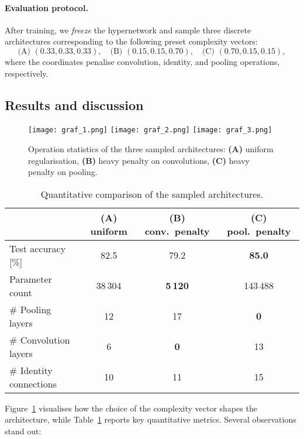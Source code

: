 \documentclass{article}
\begin{document}
\paragraph{Evaluation protocol.}
After training, we \emph{freeze} the hypernetwork and sample three discrete architectures corresponding to the following preset complexity vectors:
\[
\text{(A) } (0.33,0.33,0.33),\quad
\text{(B) } (0.15,0.15,0.70),\quad
\text{(C) } (0.70,0.15,0.15),
\]
where the coordinates penalise convolution, identity, and pooling operations, respectively.  



\subsection{Results and discussion}


\begin{figure}[!ht]
    \centering
    \texttt{[image: graf\_1.png]}\hfill
    \texttt{[image: graf\_2.png]}\hfill
    \texttt{[image: graf\_3.png]}
    \caption{Operation statistics of the three sampled
    architectures: \textbf{(A)} uniform regularisation,
    \textbf{(B)} heavy penalty on convolutions,
    \textbf{(C)} heavy penalty on pooling.}
    \label{fig:operation-distribution}
\end{figure}

\begin{table}[!ht]
    \centering
    \caption{Quantitative comparison of the sampled architectures.}
    \label{tab:quantitative-results}
    \begin{tabular}{lccc}
        \hline
        & (A) uniform & (B) conv.\ penalty & (C) pool.\ penalty \\[2pt] \hline
        Test accuracy [\%]           & 82.5 & 79.2 & \textbf{85.0} \\
        Parameter count              & 38\,304 & \textbf{5\,120} & 143\,488 \\
        \# Pooling layers            & 12 & 17 & \textbf{0} \\
        \# Convolution layers        & 6  & \textbf{0} & 13 \\
        \# Identity connections      & 10 & 11 & 15 \\\hline
    \end{tabular}
\end{table}

Figure~\ref{fig:operation-distribution} visualises how the choice of the complexity vector shapes the architecture, while
Table~\ref{tab:quantitative-results} reports key quantitative metrics.
Several observations stand out:
\end{document}
